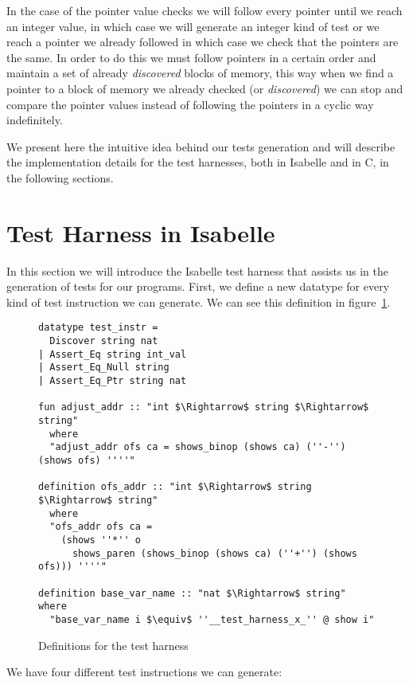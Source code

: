 In the case of the pointer value checks we will follow every pointer until we reach an integer value, in which case we will generate an integer kind of test or we reach a pointer we already followed in which case we check that the pointers are the same.
In order to do this we must follow pointers in a certain order and maintain a set of already \textit{discovered} blocks of memory, this way when we find a pointer to a block of memory we already checked (or \textit{discovered}) we can stop and compare the pointer values instead of following the pointers in a cyclic way indefinitely.

We present here the intuitive idea behind our tests generation and will describe the implementation details for the test harnesses, both in Isabelle and in C, in the following sections.

\section{Test Harness in Isabelle}

In this section we will introduce the Isabelle test harness that assists us in the generation of tests for our programs.
First, we define a new datatype for every kind of test instruction we can generate.
We can see this definition in figure~\ref{fig:test_harness_datatype}.


\begin{figure}
\begin{lstlisting}[mathescape=true]
datatype test_instr = 
  Discover string nat
| Assert_Eq string int_val   
| Assert_Eq_Null string
| Assert_Eq_Ptr string nat

fun adjust_addr :: "int $\Rightarrow$ string $\Rightarrow$ string" 
  where
  "adjust_addr ofs ca = shows_binop (shows ca) (''-'') (shows ofs) ''''"

definition ofs_addr :: "int $\Rightarrow$ string $\Rightarrow$ string"
  where 
  "ofs_addr ofs ca =
    (shows ''*'' o
      shows_paren (shows_binop (shows ca) (''+'') (shows ofs))) ''''"

definition base_var_name :: "nat $\Rightarrow$ string" where
  "base_var_name i $\equiv$ ''__test_harness_x_'' @ show i"
\end{lstlisting}

\caption{Definitions for the test harness}
\label{fig:test_harness_datatype}
\end{figure}

We have four different test instructions we can generate:

